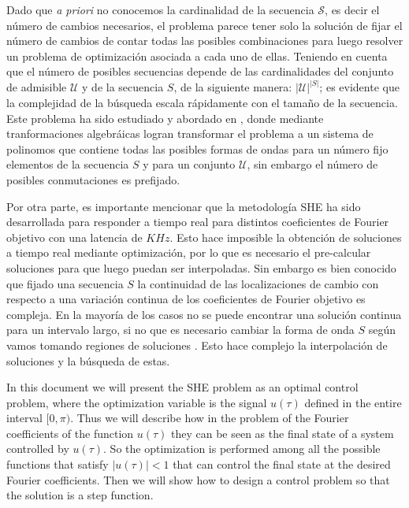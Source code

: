 Dado que \emph{a priori} no conocemos la cardinalidad de la secuencia $\mathcal{S}$, es decir el número de cambios necesarios,  el problema parece tener solo la solución de fijar el número de cambios de contar todas las posibles combinaciones para luego resolver un problema de optimización asociada a cada uno de ellas. 
%  
Teniendo en cuenta que el número de posibles secuencias depende de las cardinalidades del conjunto de admisible $\mathcal{U}$ y de la secuencia $S$, de la siguiente manera:  $|\mathcal{U}|^{|S|}$; es evidente que la complejidad de la búsqueda escala rápidamente con el tamaño de la secuencia.
% 
Este problema ha sido estudiado y abordado en \cite{Yang2015}, donde mediante tranformaciones algebráicas logran transformar el problema a un sistema de polinomos que contiene todas las posibles formas de ondas para un número fijo elementos de la secuencia $S$ y para un conjunto $\mathcal{U}$, sin embargo el número de posibles conmutaciones es prefijado. 
%
\newline

%
Por otra parte, es importante mencionar que la metodología SHE ha sido desarrollada para responder a tiempo real para distintos coeficientes de Fourier objetivo con una latencia de $KHz$. 
%
Esto hace imposible la obtención de soluciones a tiempo real mediante optimización, por lo que es necesario el pre-calcular soluciones para que luego puedan ser interpoladas.
%
Sin embargo es bien conocido que fijado una secuencia $S$ la continuidad de las localizaciones de cambio con respecto a una variación continua de los coeficientes de Fourier objetivo es compleja. 
%
En la mayoría de los casos no se puede encontrar una solución continua para un intervalo largo, si no que es necesario cambiar la forma de onda $S$ según vamos tomando regiones de soluciones \cite{Yang2015,Yang2017}. 
% 
Esto hace complejo la interpolación de soluciones y la búsqueda de estas.
\newline

%
In this document we will present the SHE problem as an optimal control problem, where the optimization variable is the signal $ u (\tau) $ defined in the entire interval $ [0,\pi) $.
%
Thus we will describe how in the problem of the Fourier coefficients of the function $ u (\tau) $ they can be seen as the final state of a system controlled by $ u (\tau) $.
%
So the optimization is performed among all the possible functions that satisfy $ | u (\tau) | <1 $ that can control the final state at the desired Fourier coefficients.
%
Then we will show how to design a control problem so that the solution is a step function.
%
\newline

